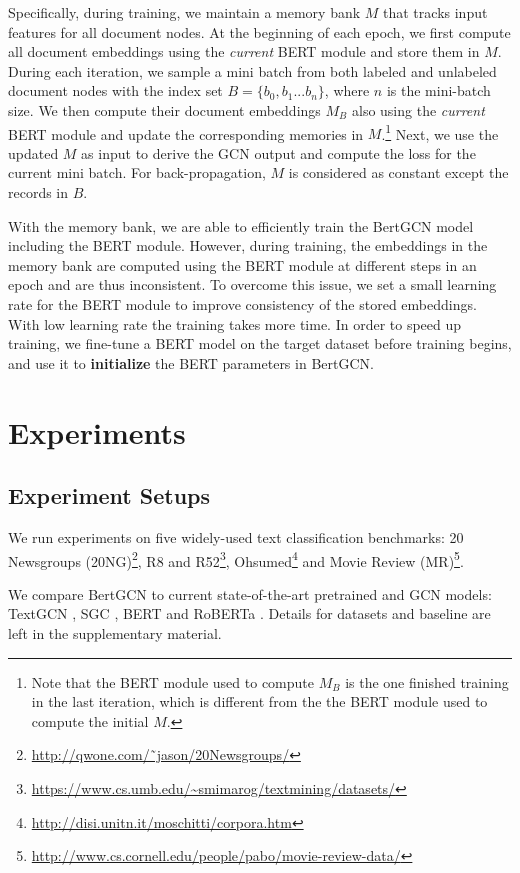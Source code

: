 \documentclass[11pt,a4paper]{article}
\begin{document}
Specifically, during training, we maintain a memory bank $M$ that tracks input features for all document nodes. At the beginning of each epoch, we first compute all document embeddings using the {\it current} BERT module and store them in $M$. During each iteration, we sample a mini batch from both labeled and unlabeled document nodes with the index set $B = \{b_0, b_1...b_n\}$, where $n$ is the mini-batch size. We then compute their document embeddings $M_B$ also using the {\it current} BERT module and update the corresponding memories in $M$.\footnote{Note that the BERT module used to compute $M_B$ is the one finished training in the last iteration, which is different from the the BERT module used to compute the initial $M$.}
Next, we use the updated $M$ as input to derive the GCN output and compute the loss for the current mini batch. For back-propagation, $M$ is considered as constant except the records in $B$.

With the memory bank, we are able to efficiently train the BertGCN model including the BERT module.
However, during training, the embeddings in the memory bank are computed using the BERT module at different steps in an epoch and are thus inconsistent. To overcome this issue, we set a small learning rate for the BERT module to improve consistency of the stored embeddings. With low learning rate the training takes more time. In order to speed up training, we fine-tune a BERT model on the target dataset before training begins, and use it to {\bf initialize} the BERT parameters  in  BertGCN.


\section{Experiments}
\subsection{Experiment Setups}
We run experiments on five widely-used  text classification benchmarks: 20 Newsgroups (20NG)\footnote{\url{http://qwone.com/˜jason/20Newsgroups/}}, R8 and R52\footnote{\url{https://www.cs.umb.edu/~smimarog/textmining/datasets/}}, Ohsumed\footnote{\url{http://disi.unitn.it/moschitti/corpora.htm}} and Movie Review (MR)\footnote{\url{http://www.cs.cornell.edu/people/pabo/movie-review-data/}}. 

We compare BertGCN to current state-of-the-art pretrained and GCN models: TextGCN \citep{yao2019graph}, SGC \citep{wu2019simplifying}, BERT \citep{devlin2018bert} and RoBERTa \citep{yinhan2019roberta}. Details for datasets and baseline are left in the supplementary material.
\end{document}
